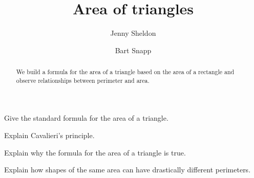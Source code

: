 \documentclass[nooutcomes,noauthor,handout,hints]{ximera}
\title{Area of triangles}
\author{Jenny Sheldon \and Bart Snapp}
\begin{document}
\begin{abstract}
  We build a formula for the area of a triangle based on the area of a
  rectangle and observe relationships between perimeter and area.
\end{abstract}
\maketitle


\begin{listOutcomes}
\item Give the standard formula for the area of a triangle.
\item Explain Cavalieri's principle.
\item Explain why the formula for the area of a triangle is true.
\item Explain how shapes of the same area can have drastically
  different perimeters.
\end{listOutcomes}



\mynewpage
\end{document}
